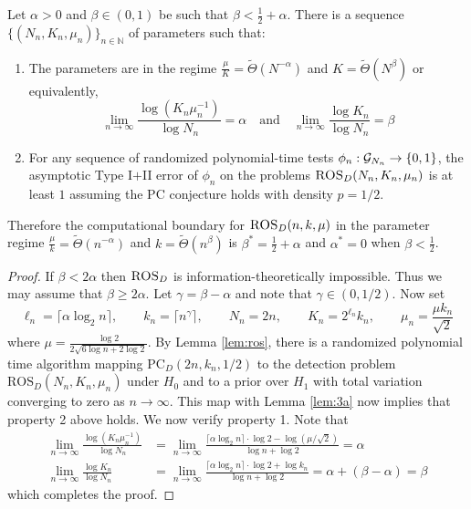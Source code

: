 \begin{theorem} \label{thm:ros}
Let $\alpha > 0$ and $\beta \in (0, 1)$ be such that $\beta < \frac{1}{2} + \alpha$. There is a sequence $\{ (N_n, K_n, \mu_n) \}_{n \in \mathbb{N}}$ of parameters such that:
\begin{enumerate}
\item The parameters are in the regime $\frac{\mu}{K} = \tilde{\Theta}(N^{-\alpha})$ and $K = \tilde{\Theta}(N^\beta)$ or equivalently,
$$\lim_{n \to \infty} \frac{\log (K_n \mu_n^{-1})}{\log N_n} = \alpha \quad \text{and} \quad \lim_{n \to \infty} \frac{\log K_n}{\log N_n} = \beta$$
\item For any sequence of randomized polynomial-time tests $\phi_n : \mathcal{G}_{N_n} \to \{0, 1\}$, the asymptotic Type I$+$II error of $\phi_n$ on the problems $\textsc{ROS}_D(N_n, K_n, \mu_n)$ is at least $1$ assuming the PC conjecture holds with density $p = 1/2$.
\end{enumerate}
Therefore the computational boundary for $\textsc{ROS}_D(n, k, \mu)$ in the parameter regime $\frac{\mu}{k} = \tilde{\Theta}(n^{-\alpha})$ and $k = \tilde{\Theta}(n^\beta)$ is $\beta^* = \frac{1}{2} + \alpha$ and $\alpha^* = 0$ when $\beta < \frac{1}{2}$.
\end{theorem}

\begin{proof}
If $\beta < 2\alpha$ then $\textsc{ROS}_D$ is information-theoretically impossible. Thus we may assume that $\beta \ge 2\alpha$. Let $\gamma = \beta - \alpha$ and note that $\gamma \in (0, 1/2)$. Now set
$$\ell_n = \lceil \alpha \log_2 n \rceil, \quad \quad k_n = \lceil n^{\gamma} \rceil, \quad \quad N_n = 2n, \quad \quad K_n = 2^{\ell_n} k_n, \quad \quad \mu_n =\frac{\mu k_n}{\sqrt{2}}$$
where $\mu = \frac{\log 2}{2 \sqrt{6 \log n + 2\log 2}}$. By Lemma \ref{lem:ros}, there is a randomized polynomial time algorithm mapping $\text{PC}_D(2n, k_n, 1/2)$ to the detection problem $\text{ROS}_D(N_n, K_n, \mu_n)$ under $H_0$ and to a prior over $H_1$ with total variation converging to zero as $n \to \infty$. This map with Lemma \ref{lem:3a} now implies that property 2 above holds. We now verify property 1. Note that
\begin{align*}
\lim_{n \to \infty} \frac{\log (K_n \mu_n^{-1})}{\log N_n} &= \lim_{n \to \infty} \frac{\lceil \alpha \log_2 n \rceil \cdot \log 2 - \log (\mu/\sqrt{2})}{\log n + \log 2} = \alpha \\
\lim_{n \to \infty} \frac{\log K_n}{\log N_n} &= \lim_{n \to \infty} \frac{\lceil \alpha \log_2 n \rceil \cdot \log 2 + \log k_n}{\log n + \log 2} = \alpha + (\beta - \alpha) = \beta
\end{align*}
which completes the proof.
\end{proof}

